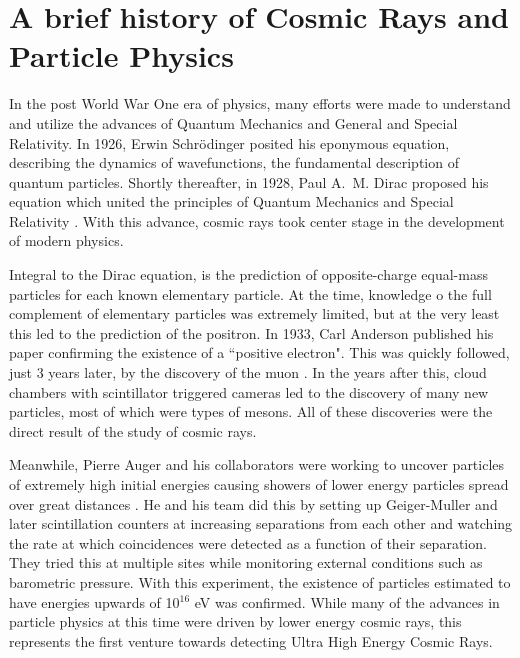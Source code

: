\section{A brief history of Cosmic Rays and Particle Physics}
\label{history}
In the post World War One era of physics, many efforts were made to understand and utilize the advances of Quantum Mechanics and General and Special Relativity. In 1926, Erwin Schr{\"o}dinger posited his eponymous equation, describing the dynamics of wavefunctions, the fundamental description of quantum particles.  Shortly thereafter, in 1928, Paul A.~M. Dirac proposed his equation which united the principles of Quantum Mechanics and Special Relativity \cite{dirac}. With this advance, cosmic rays took center stage in the development of modern physics.%

Integral to the Dirac equation, is the prediction of opposite-charge equal-mass particles for each known elementary particle. At the time, knowledge o the full complement of elementary particles was extremely limited, but at the very least this led to the prediction of the positron. In 1933, Carl Anderson published his paper confirming the existence of a ``positive electron". This was quickly followed, just 3 years later, by the discovery of the muon \cite{positron,muon}. In the years after this, cloud chambers with scintillator triggered cameras led to the discovery of many new particles, most of which were types of mesons.  All of these discoveries were the direct result of the study of cosmic rays.

Meanwhile, Pierre Auger and his collaborators were working to uncover particles of extremely high initial energies causing showers of lower energy particles spread over great distances \cite{firstshowers}. He and his team did this by setting up Geiger-Muller and later scintillation counters at increasing separations from each other and watching the rate at which coincidences were detected as a function of their separation. They tried this at multiple sites while monitoring external conditions such as barometric pressure. With this experiment, the existence of particles estimated to have energies upwards of 10$^{16}$ eV was confirmed. While many of the advances in particle physics at this time were driven by lower energy cosmic rays, this represents the first venture towards detecting Ultra High Energy Cosmic Rays. 
